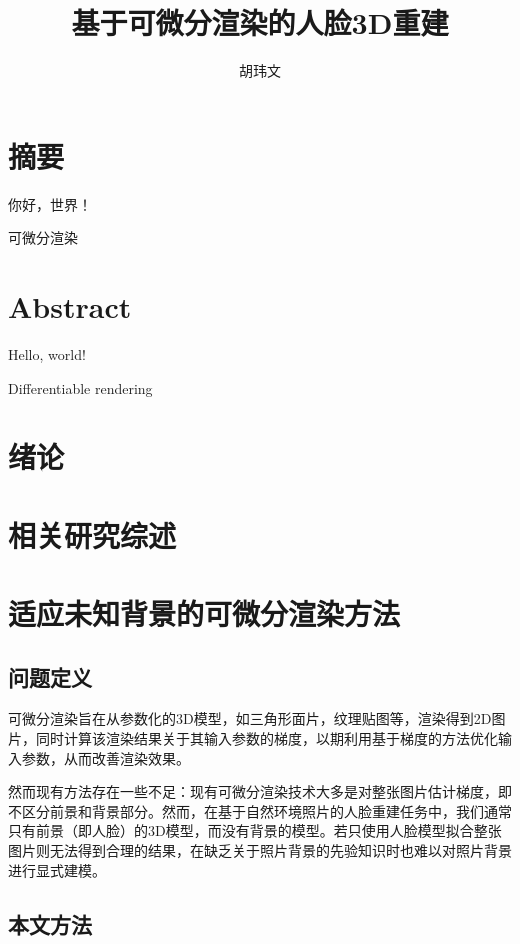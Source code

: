 \documentclass{scutmaster}
\title{基于可微分渲染的人脸3D重建}
\author{胡玮文}
\begin{document}
\maketitle
\maketitleEN
\nominationpage
\declareoforiginality

\frontmatter
\chapter*{摘要}

你好，世界！

 可微分渲染

\chapter*{Abstract}

Hello, world!

 Differentiable rendering

\tableofcontents

\listoffigures

\mainmatter
\chapter{绪论}

\chapter{相关研究综述}

\chapter{适应未知背景的可微分渲染方法}

\section{问题定义}

可微分渲染旨在从参数化的3D模型，如三角形面片，纹理贴图等，渲染得到2D图片，同时计算该渲染结果关于其输入参数的梯度，以期利用基于梯度的方法优化输入参数，从而改善渲染效果。

然而现有方法存在一些不足：现有可微分渲染技术大多是对整张图片估计梯度，即不区分前景和背景部分。然而，在基于自然环境照片的人脸重建任务中，我们通常只有前景（即人脸）的3D模型，而没有背景的模型。若只使用人脸模型拟合整张图片则无法得到合理的结果，在缺乏关于照片背景的先验知识时也难以对照片背景进行显式建模。

\section{本文方法}
\end{document}
